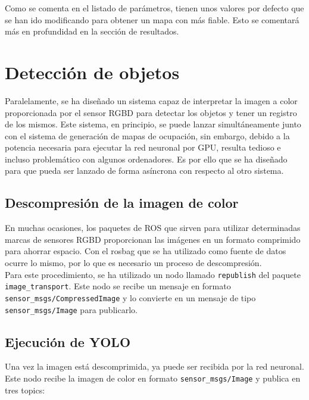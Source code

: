 Como se comenta en el listado de parámetros, tienen unos valores por defecto que se han ido modificando para obtener un mapa con más fiable. Esto se comentará más en profundidad en la sección de resultados.\\

\section{Detección de objetos}

Paralelamente, se ha diseñado un sistema capaz de interpretar la imagen a color proporcionada por el sensor RGBD para detectar los objetos y tener un registro de los mismos. Este sistema, en principio, se puede lanzar simultáneamente junto con el sistema de generación de mapas de ocupación, sin embargo, debido a la potencia necesaria para ejecutar la red neuronal por GPU, resulta tedioso e incluso problemático con algunos ordenadores. Es por ello que se ha diseñado para que pueda ser lanzado de forma asíncrona con respecto al otro sistema.\\

\subsection{Descompresión de la imagen de color}

En muchas ocasiones, los paquetes de ROS que sirven para utilizar determinadas marcas de sensores RGBD proporcionan las imágenes en un formato comprimido para ahorrar espacio. Con el rosbag que se ha utilizado como fuente de datos ocurre lo mismo, por lo que es necesario un proceso de descompresión.\\

Para este procedimiento, se ha utilizado un nodo llamado \texttt{republish} del paquete \texttt{image\_transport}. Este nodo se recibe un mensaje en formato \texttt{sensor\_msgs/\-Compressed\-Image} y lo convierte en un mensaje de tipo \texttt{sensor\_msgs/Image} para publicarlo.\\

\subsection{Ejecución de YOLO}

Una vez la imagen está descomprimida, ya puede ser recibida por la red neuronal. Este nodo recibe la imagen de color en formato \texttt{sensor\_msgs/Image} y publica en tres topics:

